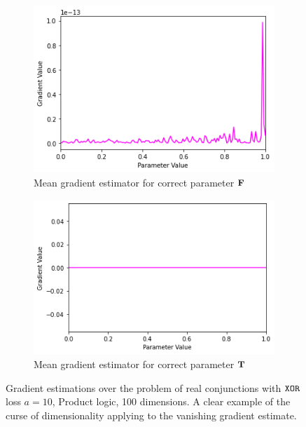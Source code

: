 \begin{figure}[ht]
\begin{subfigure}[b]{0.47\textwidth}
        \includegraphics[width=\textwidth]{imgs/grad_prod_10_falseparam_100dim_avg.png}
        \caption{Mean gradient estimator for correct parameter $\textbf{F}$}
        \label{fig:conjgrad10falseavg100}
    \end{subfigure}
    \begin{subfigure}[b]{0.47\textwidth}
        \centering
        \includegraphics[width=\textwidth]{imgs/grad_prod_10_trueparam_100dim_avg.png}
        \caption{Mean gradient estimator for correct parameter $\textbf{T}$}
        \label{fig:conjgrad10trueavg100}
    \end{subfigure}
       \caption{Gradient estimations over the problem of real conjunctions with $\texttt{XOR}$ loss $a=10$, Product logic, 100 dimensions. A clear example of the curse of dimensionality applying to the vanishing gradient estimate.}
       \label{fig:conjgrad10100}
\end{figure}


